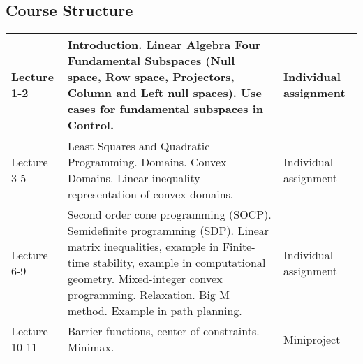 \subsection{Course Structure}

\begin{table}[h]

\begin{tabular}{p{25mm}|p{100mm}|p{30mm}}
  \hline
Lecture 1-2	& 
Introduction. \newline
Linear Algebra Four Fundamental Subspaces
(Null space, Row space, Projectors, Column and Left null spaces). \newline
Use cases for fundamental subspaces in Control. &	
Individual \newline assignment 
\\   \hline
%
Lecture 3-5 &
Least Squares and Quadratic Programming. \newline
Domains. Convex Domains. \newline
Linear inequality representation of convex domains.	& 
Individual \newline assignment 
\\   \hline
%
Lecture 6-9	& 
Second order cone programming (SOCP). \newline
Semidefinite programming (SDP). \newline
Linear matrix inequalities, example in Finite-time stability, example in computational geometry. \newline
Mixed-integer convex programming. \newline Relaxation. Big M method. Example in path planning.	& 
Individual \newline assignment 
\\   \hline
%
Lecture 10-11	& 
Barrier functions, center of constraints. \newline
Minimax.	& 
Miniproject 
\\  \hline
\end{tabular}
\end{table}